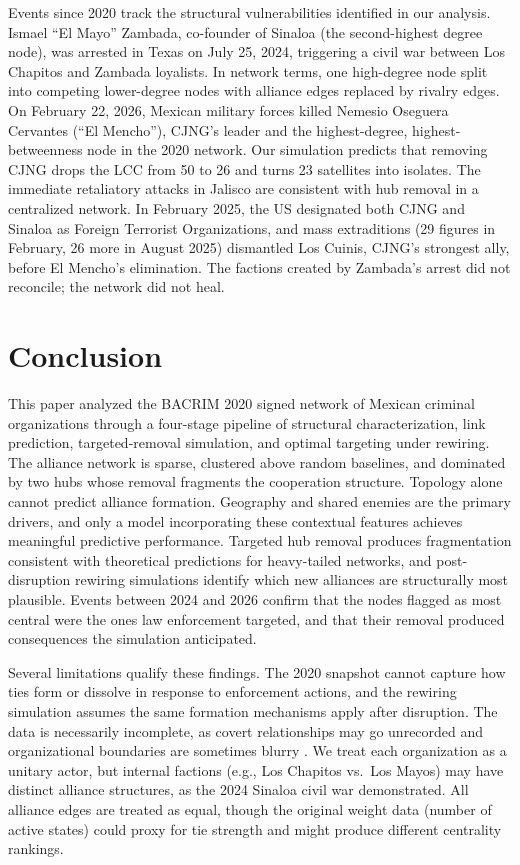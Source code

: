 \documentclass[11pt, a4paper]{article}
\begin{document}
Events since 2020 track the structural vulnerabilities identified in our analysis. Ismael ``El Mayo'' Zambada, co-founder of Sinaloa (the second-highest degree node), was arrested in Texas on July 25, 2024, triggering a civil war between Los Chapitos and Zambada loyalists. In network terms, one high-degree node split into competing lower-degree nodes with alliance edges replaced by rivalry edges. On February 22, 2026, Mexican military forces killed Nemesio Oseguera Cervantes (``El Mencho''), CJNG's leader and the highest-degree, highest-betweenness node in the 2020 network. Our simulation predicts that removing CJNG drops the LCC from 50 to 26 and turns 23 satellites into isolates. The immediate retaliatory attacks in Jalisco are consistent with hub removal in a centralized network. In February 2025, the US designated both CJNG and Sinaloa as Foreign Terrorist Organizations, and mass extraditions (29 figures in February, 26 more in August 2025) dismantled Los Cuinis, CJNG's strongest ally, before El Mencho's elimination. The factions created by Zambada's arrest did not reconcile; the network did not heal.

\section{Conclusion}\label{sec:conclusion}

This paper analyzed the BACRIM 2020 signed network of Mexican criminal organizations through a four-stage pipeline of structural characterization, link prediction, targeted-removal simulation, and optimal targeting under rewiring. The alliance network is sparse, clustered above random baselines, and dominated by two hubs whose removal fragments the cooperation structure. Topology alone cannot predict alliance formation. Geography and shared enemies are the primary drivers, and only a model incorporating these contextual features achieves meaningful predictive performance. Targeted hub removal produces fragmentation consistent with theoretical predictions for heavy-tailed networks, and post-disruption rewiring simulations identify which new alliances are structurally most plausible. Events between 2024 and 2026 confirm that the nodes flagged as most central were the ones law enforcement targeted, and that their removal produced consequences the simulation anticipated.

Several limitations qualify these findings. The 2020 snapshot cannot capture how ties form or dissolve in response to enforcement actions, and the rewiring simulation assumes the same formation mechanisms apply after disruption. The data is necessarily incomplete, as covert relationships may go unrecorded and organizational boundaries are sometimes blurry \citep{sparrow1991application}. We treat each organization as a unitary actor, but internal factions (e.g., Los Chapitos vs.\ Los Mayos) may have distinct alliance structures, as the 2024 Sinaloa civil war demonstrated. All alliance edges are treated as equal, though the original weight data (number of active states) could proxy for tie strength and might produce different centrality rankings.
\end{document}
